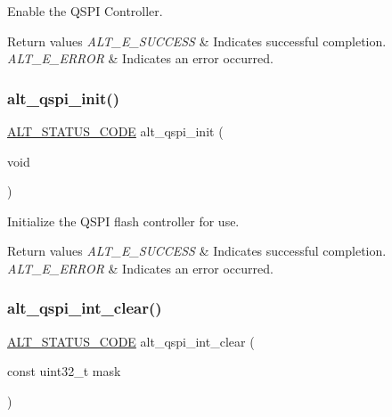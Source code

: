 Enable the Q\+S\+PI Controller.


\begin{DoxyRetVals}{Return values}
{\em A\+L\+T\+\_\+\+E\+\_\+\+S\+U\+C\+C\+E\+SS} & Indicates successful completion. \\
\hline
{\em A\+L\+T\+\_\+\+E\+\_\+\+E\+R\+R\+OR} & Indicates an error occurred. \\
\hline
\end{DoxyRetVals}
\mbox{\label{group__ALT__QSPI__CSR_gaecd5fe1f525bf35cd38257148b6be226}} 
\subsubsection{\texorpdfstring{alt\_qspi\_init()}{alt\_qspi\_init()}}
{\footnotesize\ttfamily \mbox{\hyperlink{hwlib_8h_abdb0d369f069723ca55d6c94bcaaaa12}{A\+L\+T\+\_\+\+S\+T\+A\+T\+U\+S\+\_\+\+C\+O\+DE}} alt\+\_\+qspi\+\_\+init (\begin{DoxyParamCaption}\item[{void}]{ }\end{DoxyParamCaption})}

Initialize the Q\+S\+PI flash controller for use.


\begin{DoxyRetVals}{Return values}
{\em A\+L\+T\+\_\+\+E\+\_\+\+S\+U\+C\+C\+E\+SS} & Indicates successful completion. \\
\hline
{\em A\+L\+T\+\_\+\+E\+\_\+\+E\+R\+R\+OR} & Indicates an error occurred. \\
\hline
\end{DoxyRetVals}
\mbox{\label{group__ALT__QSPI__CSR_gaf436f88abd8e2af796cc070792db5168}} 
\subsubsection{\texorpdfstring{alt\_qspi\_int\_clear()}{alt\_qspi\_int\_clear()}}
{\footnotesize\ttfamily \mbox{\hyperlink{hwlib_8h_abdb0d369f069723ca55d6c94bcaaaa12}{A\+L\+T\+\_\+\+S\+T\+A\+T\+U\+S\+\_\+\+C\+O\+DE}} alt\+\_\+qspi\+\_\+int\+\_\+clear (\begin{DoxyParamCaption}\item[{const uint32\+\_\+t}]{mask }\end{DoxyParamCaption})}


